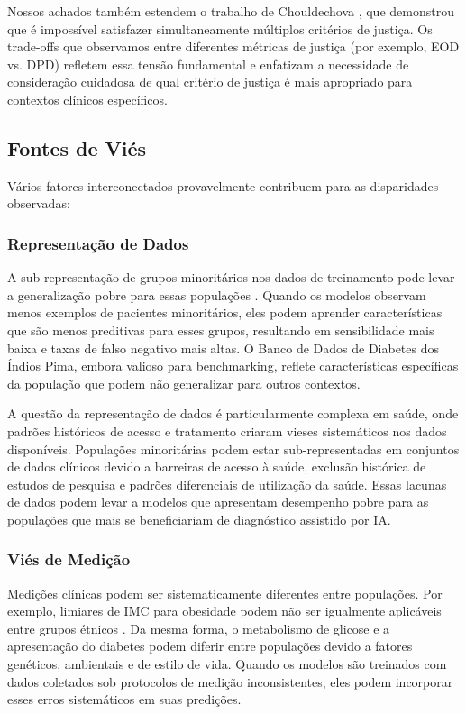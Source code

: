 Nossos achados também estendem o trabalho de Chouldechova 
\cite{chouldechova2017}, que demonstrou que é impossível satisfazer 
simultaneamente múltiplos critérios de justiça. Os trade-offs que 
observamos entre diferentes métricas de justiça (por exemplo, EOD vs. 
DPD) refletem essa tensão fundamental e enfatizam a necessidade de 
consideração cuidadosa de qual critério de justiça é mais apropriado 
para contextos clínicos específicos.

\subsection{Fontes de Viés}

Vários fatores interconectados provavelmente contribuem para as 
disparidades observadas:

\subsubsection{Representação de Dados}

A sub-representação de grupos minoritários nos dados de treinamento pode 
levar a generalização pobre para essas populações \cite{mehrabi2021}. 
Quando os modelos observam menos exemplos de pacientes minoritários, eles 
podem aprender características que são menos preditivas para esses grupos, 
resultando em sensibilidade mais baixa e taxas de falso negativo mais 
altas. O Banco de Dados de Diabetes dos Índios Pima, embora valioso 
para benchmarking, reflete características específicas da população que 
podem não generalizar para outros contextos.

A questão da representação de dados é particularmente complexa em saúde, 
onde padrões históricos de acesso e tratamento criaram vieses sistemáticos 
nos dados disponíveis. Populações minoritárias podem estar sub-representadas 
em conjuntos de dados clínicos devido a barreiras de acesso à saúde, 
exclusão histórica de estudos de pesquisa e padrões diferenciais de 
utilização da saúde. Essas lacunas de dados podem levar a modelos que 
apresentam desempenho pobre para as populações que mais se beneficiariam 
de diagnóstico assistido por IA.

\subsubsection{Viés de Medição}

Medições clínicas podem ser sistematicamente diferentes entre populações. 
Por exemplo, limiares de IMC para obesidade podem não ser igualmente 
aplicáveis entre grupos étnicos \cite{who2000}. Da mesma forma, o 
metabolismo de glicose e a apresentação do diabetes podem diferir entre 
populações devido a fatores genéticos, ambientais e de estilo de vida. 
Quando os modelos são treinados com dados coletados sob protocolos de 
medição inconsistentes, eles podem incorporar esses erros sistemáticos 
em suas predições.


